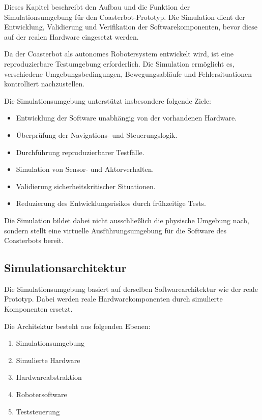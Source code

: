 Dieses Kapitel beschreibt den Aufbau und die Funktion der
Simulationsumgebung für den Coasterbot-Prototyp. Die Simulation dient
der Entwicklung, Validierung und Verifikation der Softwarekomponenten,
bevor diese auf der realen Hardware eingesetzt werden.

Da der Coasterbot als autonomes Robotersystem entwickelt wird, ist eine
reproduzierbare Testumgebung erforderlich. Die Simulation ermöglicht es,
verschiedene Umgebungsbedingungen, Bewegungsabläufe und
Fehlersituationen kontrolliert nachzustellen.

Die Simulationsumgebung unterstützt insbesondere folgende Ziele:

\begin{itemize}
\tightlist
\item
  Entwicklung der Software unabhängig von der vorhandenen Hardware.
\item
  Überprüfung der Navigations- und Steuerungslogik.
\item
  Durchführung reproduzierbarer Testfälle.
\item
  Simulation von Sensor- und Aktorverhalten.
\item
  Validierung sicherheitskritischer Situationen.
\item
  Reduzierung des Entwicklungsrisikos durch frühzeitige Tests.
\end{itemize}

Die Simulation bildet dabei nicht ausschließlich die physische Umgebung
nach, sondern stellt eine virtuelle Ausführungsumgebung für die Software
des Coasterbots bereit.

\subsection{Simulationsarchitektur}\label{simulationsarchitektur-1}

Die Simulationsumgebung basiert auf derselben Softwarearchitektur wie
der reale Prototyp. Dabei werden reale Hardwarekomponenten durch
simulierte Komponenten ersetzt.

Die Architektur besteht aus folgenden Ebenen:

\begin{enumerate}
\def\labelenumi{\arabic{enumi}.}
\tightlist
\item
  Simulationsumgebung
\item
  Simulierte Hardware
\item
  Hardwareabstraktion
\item
  Robotersoftware
\item
  Teststeuerung
\end{enumerate}

